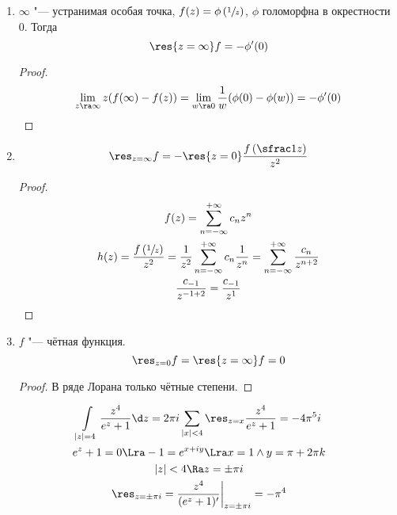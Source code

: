 \begin{enumerate}
\item
	$\infty$ "--- устранимая особая точка, $f(z) = \phi\left(\sfrac1z\right)$, $\phi$ голоморфна в окрестности 0.
	Тогда
	\[ \res{z=\infty} f = -\phi'(0) \]
	\begin{proof}
		\[
			\lim_{z\ra\infty} z(f(\infty) - f(z))
			= \lim_{w\ra0} \frac1w(\phi(0) - \phi(w))
			= -\phi'(0)
		\]
	\end{proof}

\item
	\[ \res_{z=\infty} f = -\res{z=0} \frac{f\left(\sfrac1z\right)}{z^2} \]
	\begin{proof}
		\begin{gather*}
			f(z)
			= \sum_{n=-\infty}^{+\infty} c_n z^n \\
			h(z)
			= \frac{f\left(\sfrac1z\right)}{z^2}
			= \frac1{z^2} \sum_{n=-\infty}^{+\infty} c_n \frac1{z^n}
			= \sum_{n=-\infty}^{+\infty} \frac{c_n}{z^{n+2}} \\
			\frac{c_{-1}}{z^{-1+2}} = \frac{c_{-1}}{z^1}
		\end{gather*}
	\end{proof}

\item
	$f$ "--- чётная функция.
	\[ \res_{z=0} f = \res{z=\infty} f = 0 \]
	\begin{proof}
		В ряде Лорана только чётные степени.
	\end{proof}
\end{enumerate}

\begin{exmp}
	\begin{gather*}
		\int\limits_{|z|=4} \frac{z^4}{e^z + 1} \d z
		= 2\pi i \sum_{|x|<4} \res_{z=x} \frac{z^4}{e^z + 1}
		= -4\pi^5 i \\
		e^z + 1 = 0
		\Lra -1 = e^{x+iy}
		\Lra x = 1 \land y = \pi + 2\pi k \\
		|z| < 4 \Ra z = \pm \pi i \\
		\res_{z=\pm\pi i}
		= \frac{z^4}{(e^z + 1)'} \biggr|_{z=\pm\pi i}
		= -\pi^4
	\end{gather*}
\end{exmp}


